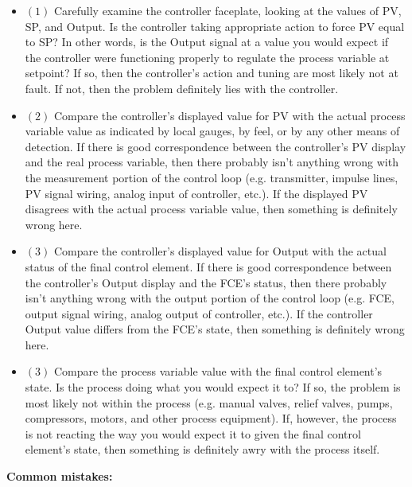 \begin{itemize}
\item{$(1)$}  Carefully examine the controller faceplate, looking at the values of PV, SP, and Output.  Is the controller taking appropriate action to force PV equal to SP?  In other words, is the Output signal at a value you would expect if the controller were functioning properly to regulate the process variable at setpoint?  If so, then the controller's action and tuning are most likely not at fault.  If not, then the problem definitely lies with the controller.
\item{$(2)$}  Compare the controller's displayed value for PV with the actual process variable value as indicated by local gauges, by feel, or by any other means of detection.  If there is good correspondence between the controller's PV display and the real process variable, then there probably isn't anything wrong with the measurement portion of the control loop (e.g. transmitter, impulse lines, PV signal wiring, analog input of controller, etc.).  If the displayed PV disagrees with the actual process variable value, then something is definitely wrong here.
\item{$(3)$}  Compare the controller's displayed value for Output with the actual status of the final control element.  If there is good correspondence between the controller's Output display and the FCE's status, then there probably isn't anything wrong with the output portion of the control loop (e.g. FCE, output signal wiring, analog output of controller, etc.).  If the controller Output value differs from the FCE's state, then something is definitely wrong here.
\item{$(3)$}  Compare the process variable value with the final control element's state.  Is the process doing what you would expect it to?  If so, the problem is most likely not within the process (e.g. manual valves, relief valves, pumps, compressors, motors, and other process equipment).  If, however, the process is not reacting the way you would expect it to given the final control element's state, then something is definitely awry with the process itself.
\end{itemize}





\vskip 10pt

\filbreak

{\bf Common mistakes:}

